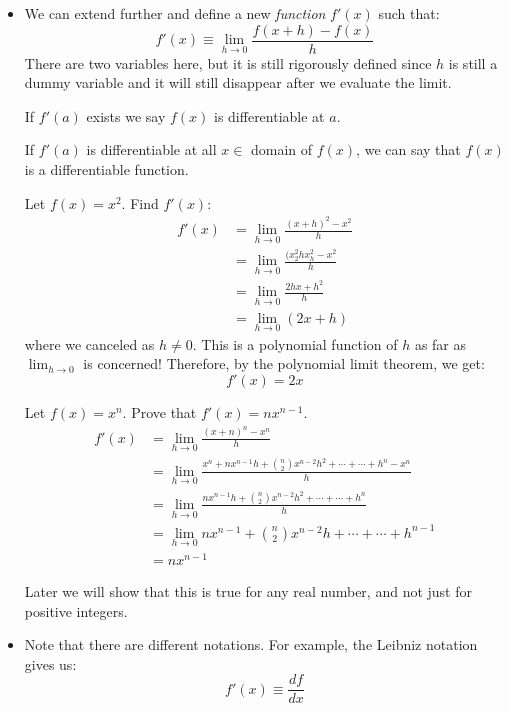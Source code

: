 \begin{itemize}
\begin{equation}
    \end{equation}
    \item We can extend further and define a new \textit{function} $f'(x)$ such that:
    \begin{equation}
        f'(x) \equiv \lim_{h\to 0} \frac{f(x+h)-f(x)}{h}
        \label{eq:}
    \end{equation}
    There are two variables here, but it is still rigorously defined since $h$ is still a dummy variable and it will still disappear after we evaluate the limit.
    \begin{definition}
        If $f'(a)$ exists we say $f(x)$ is differentiable at $a$.
    \end{definition}
    \begin{definition}
        If $f'(a)$ is differentiable at all $x\in $ domain of $f(x)$, we can say that $f(x)$ is a differentiable function.
    \end{definition}
    \begin{example}
        Let $f(x)=x^2$. Find $f'(x)$:
        \begin{align}
            f'(x) &= \lim_{h\to 0} \frac{(x+h)^2-x^2}{h} \\ 
            &= \lim_{h\to 0} \frac{(x^2_2hx_h^2-x^2}{h} \\ 
            &= \lim_{h\to 0} \frac{2hx+h^2}{h} \\ 
            &= \lim_{h\to 0} (2x+h)
        \end{align}
        where we canceled as $h\neq 0$. This is a polynomial function of $h$ as far as $\lim_{h\to 0}$ is concerned! Therefore, by the polynomial limit theorem, we get:
        \begin{equation}
            f'(x) = 2x
            \label{eq:}
        \end{equation}
    \end{example}
    \begin{example}
        Let $f(x)=x^n$. Prove that $f'(x)=nx^{n-1}$.
        \begin{align}
            f'(x) &= \lim_{h\to 0}\frac{(x+n)^n-x^n}{h} \\ 
            &= \lim_{h\to 0} \frac{x^n+nx^{n-1}h+\binom{n}{2}x^{n-2}h^2+\cdots + \cdots + h^n-x^n}{h} \\ 
            &=  \lim_{h\to 0} \frac{nx^{n-1}h+\binom{n}{2}x^{n-2}h^2+\cdots + \cdots + h^n}{h} \\ 
            &= \lim_{h\to 0} nx^{n-1}+\binom{n}{2}x^{n-2}h+\cdots + \cdots + h^{n-1} \\ 
            &= nx^{n-1}
        \end{align}
    \end{example}
    Later we will show that this is true for any real number, and not just for positive integers.
    \item Note that there are different notations. For example, the Leibniz notation gives us:
    \begin{equation}
        f'(x) \equiv \frac{df}{dx}
        \label{eq:}
    \end{equation}
    
\end{itemize}